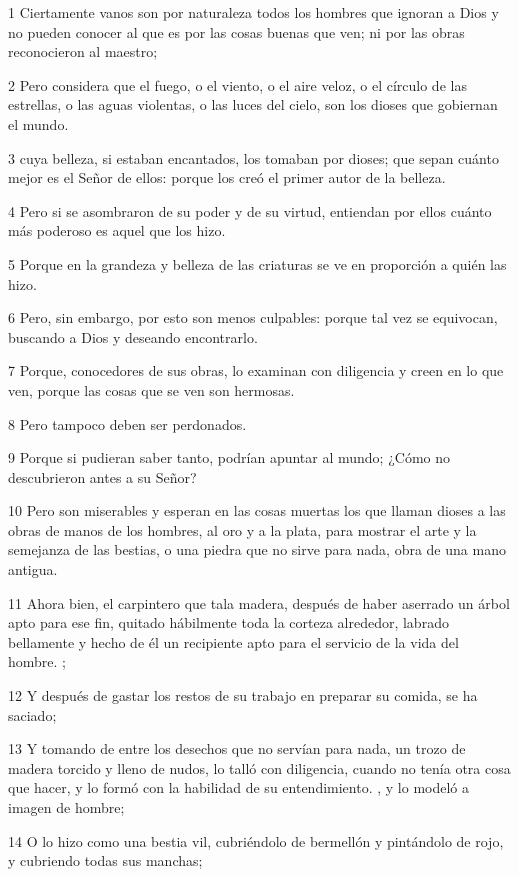 \par 1 Ciertamente vanos son por naturaleza todos los hombres que ignoran a Dios y no pueden conocer al que es por las cosas buenas que ven; ni por las obras reconocieron al maestro;
\par 2 Pero considera que el fuego, o el viento, o el aire veloz, o el círculo de las estrellas, o las aguas violentas, o las luces del cielo, son los dioses que gobiernan el mundo.
\par 3 cuya belleza, si estaban encantados, los tomaban por dioses; que sepan cuánto mejor es el Señor de ellos: porque los creó el primer autor de la belleza.
\par 4 Pero si se asombraron de su poder y de su virtud, entiendan por ellos cuánto más poderoso es aquel que los hizo.
\par 5 Porque en la grandeza y belleza de las criaturas se ve en proporción a quién las hizo.
\par 6 Pero, sin embargo, por esto son menos culpables: porque tal vez se equivocan, buscando a Dios y deseando encontrarlo.
\par 7 Porque, conocedores de sus obras, lo examinan con diligencia y creen en lo que ven, porque las cosas que se ven son hermosas.
\par 8 Pero tampoco deben ser perdonados.
\par 9 Porque si pudieran saber tanto, podrían apuntar al mundo; ¿Cómo no descubrieron antes a su Señor?
\par 10 Pero son miserables y esperan en las cosas muertas los que llaman dioses a las obras de manos de los hombres, al oro y a la plata, para mostrar el arte y la semejanza de las bestias, o una piedra que no sirve para nada, obra de una mano antigua.
\par 11 Ahora bien, el carpintero que tala madera, después de haber aserrado un árbol apto para ese fin, quitado hábilmente toda la corteza alrededor, labrado bellamente y hecho de él un recipiente apto para el servicio de la vida del hombre. ;
\par 12 Y después de gastar los restos de su trabajo en preparar su comida, se ha saciado;
\par 13 Y tomando de entre los desechos que no servían para nada, un trozo de madera torcido y lleno de nudos, lo talló con diligencia, cuando no tenía otra cosa que hacer, y lo formó con la habilidad de su entendimiento. , y lo modeló a imagen de hombre;
\par 14 O lo hizo como una bestia vil, cubriéndolo de bermellón y pintándolo de rojo, y cubriendo todas sus manchas;
